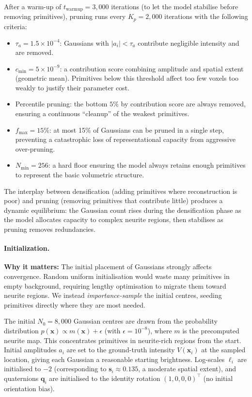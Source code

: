 \documentclass[11pt,a4paper]{article}
\begin{document}
After a warm-up of $t_{\mathrm{warmup}} = 3{,}000$ iterations (to let the model stabilise before removing primitives), pruning runs every $K_p = 2{,}000$ iterations with the following criteria:
\begin{itemize}
    \item $\tau_a = 1.5\times10^{-4}$: Gaussians with $|a_i| < \tau_a$ contribute negligible intensity and are removed.
    \item $c_{\min} = 5\times10^{-9}$: a contribution score combining amplitude and spatial extent (geometric mean).  Primitives below this threshold affect too few voxels too weakly to justify their parameter cost.
    \item Percentile pruning: the bottom $5\%$ by contribution score are always removed, ensuring a continuous ``cleanup'' of the weakest primitives.
    \item $f_{\max} = 15\%$: at most 15\% of Gaussians can be pruned in a single step, preventing a catastrophic loss of representational capacity from aggressive over-pruning.
    \item $N_{\min} = 256$: a hard floor ensuring the model always retains enough primitives to represent the basic volumetric structure.
\end{itemize}
The interplay between densification (adding primitives where reconstruction is poor) and pruning (removing primitives that contribute little) produces a dynamic equilibrium: the Gaussian count rises during the densification phase as the model allocates capacity to complex neurite regions, then stabilises as pruning removes redundancies.

\paragraph{Initialization.}
\textbf{Why it matters:} The initial placement of Gaussians strongly affects convergence.  Random uniform initialisation would waste many primitives in empty background, requiring lengthy optimisation to migrate them toward neurite regions.  We instead \emph{importance-sample} the initial centres, seeding primitives directly where they are most needed.

The initial $N_0 = 8{,}000$ Gaussian centres are drawn from the probability distribution $p(\mathbf{x}) \propto m(\mathbf{x}) + \epsilon$ (with $\epsilon = 10^{-8}$), where $m$ is the precomputed neurite map.  This concentrates primitives in neurite-rich regions from the start.  Initial amplitudes $a_i$ are set to the ground-truth intensity $V(\mathbf{x}_i)$ at the sampled location, giving each Gaussian a reasonable starting brightness.  Log-scales $\boldsymbol{\ell}_i$ are initialised to $-2$ (corresponding to $\mathbf{s}_i \approx 0.135$, a moderate spatial extent), and quaternions $\mathbf{q}_i$ are initialised to the identity rotation $(1,0,0,0)^\top$ (no initial orientation bias).
\end{document}
